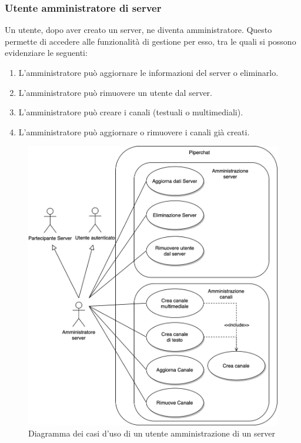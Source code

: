 %
%
%
\subsubsection{Utente amministratore di server}

Un utente, dopo aver creato un server, ne diventa amministratore.
%
Questo permette di accedere alle funzionalità di gestione per esso, tra le quali si possono evidenziare le seguenti:

\begin{enumerate}
    \item L'amministratore può aggiornare le informazioni del server o eliminarlo.

    \item L'amministratore può rimuovere un utente dal server.

    \item L'amministratore può creare i canali (testuali o multimediali).

    \item L'amministratore può aggiornare o rimuovere i canali già creati.
\end{enumerate}

\begin{figure}[H]
    \centering
    \includegraphics[width=1\linewidth]{sections/01-goal/img/use-cases/piperchat-Casi d'uso-3.jpg}
    \caption{Diagramma dei casi d'uso di un utente amministrazione di un server}
\end{figure}

